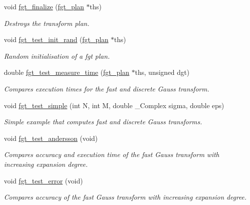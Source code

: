 \begin{CompactItemize}
void \hyperlink{group__applications__fastgauss_g4634fe28b9e1be61106871cf0e61ef83}{fgt\_\-finalize} (\hyperlink{structfgt__plan}{fgt\_\-plan} $\ast$ths)
\begin{CompactList}\small\item\em Destroys the transform plan. \item\end{CompactList}\item 
void \hyperlink{group__applications__fastgauss_g317a464dbf2df948bb94ef5748710e57}{fgt\_\-test\_\-init\_\-rand} (\hyperlink{structfgt__plan}{fgt\_\-plan} $\ast$ths)
\begin{CompactList}\small\item\em Random initialisation of a fgt plan. \item\end{CompactList}\item 
double \hyperlink{group__applications__fastgauss_gbebca8cc0714b36c3b47e2a5d0317960}{fgt\_\-test\_\-measure\_\-time} (\hyperlink{structfgt__plan}{fgt\_\-plan} $\ast$ths, unsigned dgt)
\begin{CompactList}\small\item\em Compares execution times for the fast and discrete Gauss transform. \item\end{CompactList}\item 
void \hyperlink{group__applications__fastgauss_g74b5dd8d6f593462a2b37b290ad4d227}{fgt\_\-test\_\-simple} (int N, int M, double \_\-Complex sigma, double eps)
\begin{CompactList}\small\item\em Simple example that computes fast and discrete Gauss transforms. \item\end{CompactList}\item 
void \hyperlink{group__applications__fastgauss_gac05fa78924012be74e54ddbd098892f}{fgt\_\-test\_\-andersson} (void)
\begin{CompactList}\small\item\em Compares accuracy and execution time of the fast Gauss transform with increasing expansion degree. \item\end{CompactList}\item 
void \hyperlink{group__applications__fastgauss_gab0a7e29242524d33269448fc4612946}{fgt\_\-test\_\-error} (void)
\begin{CompactList}\small\item\em Compares accuracy of the fast Gauss transform with increasing expansion degree. \item\end{CompactList}\item 

\end{CompactItemize}
